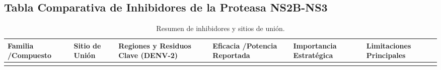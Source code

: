\subsection{Tabla Comparativa de Inhibidores de la Proteasa NS2B-NS3}
\begingroup
\scriptsize %
\setlength{\tabcolsep}{1.5pt} %
\begin{xltabular}{\textwidth}{
  >{\hsize\RaggedRight\arraybackslash}X
  >{\hsize\RaggedRight\arraybackslash}X
  >{\hsize\RaggedRight\arraybackslash}X
  >{\hsize\RaggedRight\arraybackslash}X
  >{\hsize\RaggedRight\arraybackslash}X
  >{\hsize\RaggedRight\arraybackslash}X
}
\caption{Resumen de inhibidores y sitios de unión.} \label{tab:inhibidores} \\ %
\toprule
\textbf{Familia /\allowbreak Compuesto} & \textbf{Sitio de Unión} & \textbf{Regiones y Residuos Clave (DENV-2)} & \textbf{Eficacia /\allowbreak Potencia Reportada} & \textbf{Importancia Estratégica} & \textbf{Limitaciones Principales} \\
\midrule
\endhead

\bottomrule
\endfoot


\end{xltabular}
